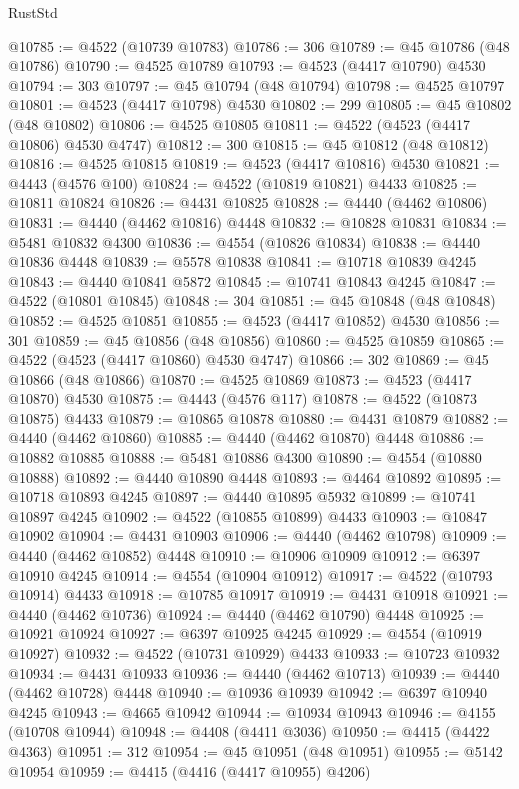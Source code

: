 \begin{lexlean}{RustStd}
\begin{coremodule}
{\begin{coremodule}
{{{{{{{{{{{{{{{{{{{{{{{{{{{{{{{{{{{{{{{{{{{{{{{{{{{{{{{{{{{{@10785 := @4522 (@10739 @10783)
@10786 := 306
@10789 := @45 @10786 (@48 @10786)
@10790 := @4525 @10789
@10793 := @4523 (@4417 @10790) @4530
@10794 := 303
@10797 := @45 @10794 (@48 @10794)
@10798 := @4525 @10797
@10801 := @4523 (@4417 @10798) @4530
@10802 := 299
@10805 := @45 @10802 (@48 @10802)
@10806 := @4525 @10805
@10811 := @4522 (@4523 (@4417 @10806) @4530 @4747)
@10812 := 300
@10815 := @45 @10812 (@48 @10812)
@10816 := @4525 @10815
@10819 := @4523 (@4417 @10816) @4530
@10821 := @4443 (@4576 @100)
@10824 := @4522 (@10819 @10821) @4433
@10825 := @10811 @10824
@10826 := @4431 @10825
@10828 := @4440 (@4462 @10806)
@10831 := @4440 (@4462 @10816) @4448
@10832 := @10828 @10831
@10834 := @5481 @10832 @4300
@10836 := @4554 (@10826 @10834)
@10838 := @4440 @10836 @4448
@10839 := @5578 @10838
@10841 := @10718 @10839 @4245
@10843 := @4440 @10841 @5872
@10845 := @10741 @10843 @4245
@10847 := @4522 (@10801 @10845)
@10848 := 304
@10851 := @45 @10848 (@48 @10848)
@10852 := @4525 @10851
@10855 := @4523 (@4417 @10852) @4530
@10856 := 301
@10859 := @45 @10856 (@48 @10856)
@10860 := @4525 @10859
@10865 := @4522 (@4523 (@4417 @10860) @4530 @4747)
@10866 := 302
@10869 := @45 @10866 (@48 @10866)
@10870 := @4525 @10869
@10873 := @4523 (@4417 @10870) @4530
@10875 := @4443 (@4576 @117)
@10878 := @4522 (@10873 @10875) @4433
@10879 := @10865 @10878
@10880 := @4431 @10879
@10882 := @4440 (@4462 @10860)
@10885 := @4440 (@4462 @10870) @4448
@10886 := @10882 @10885
@10888 := @5481 @10886 @4300
@10890 := @4554 (@10880 @10888)
@10892 := @4440 @10890 @4448
@10893 := @4464 @10892
@10895 := @10718 @10893 @4245
@10897 := @4440 @10895 @5932
@10899 := @10741 @10897 @4245
@10902 := @4522 (@10855 @10899) @4433
@10903 := @10847 @10902
@10904 := @4431 @10903
@10906 := @4440 (@4462 @10798)
@10909 := @4440 (@4462 @10852) @4448
@10910 := @10906 @10909
@10912 := @6397 @10910 @4245
@10914 := @4554 (@10904 @10912)
@10917 := @4522 (@10793 @10914) @4433
@10918 := @10785 @10917
@10919 := @4431 @10918
@10921 := @4440 (@4462 @10736)
@10924 := @4440 (@4462 @10790) @4448
@10925 := @10921 @10924
@10927 := @6397 @10925 @4245
@10929 := @4554 (@10919 @10927)
@10932 := @4522 (@10731 @10929) @4433
@10933 := @10723 @10932
@10934 := @4431 @10933
@10936 := @4440 (@4462 @10713)
@10939 := @4440 (@4462 @10728) @4448
@10940 := @10936 @10939
@10942 := @6397 @10940 @4245
@10943 := @4665 @10942
@10944 := @10934 @10943
@10946 := @4155 (@10708 @10944)
@10948 := @4408 (@4411 @3036)
@10950 := @4415 (@4422 @4363)
@10951 := 312
@10954 := @45 @10951 (@48 @10951)
@10955 := @5142 @10954
@10959 := @4415 (@4416 (@4417 @10955) @4206)
}}}}}}}}}}}}}}}}}}}}}}}}}}}}}}}}}}}}}}}}}}}}}}}}}}}}}}}}}}}}
\end{coremodule}}
\end{coremodule}
\end{lexlean}
